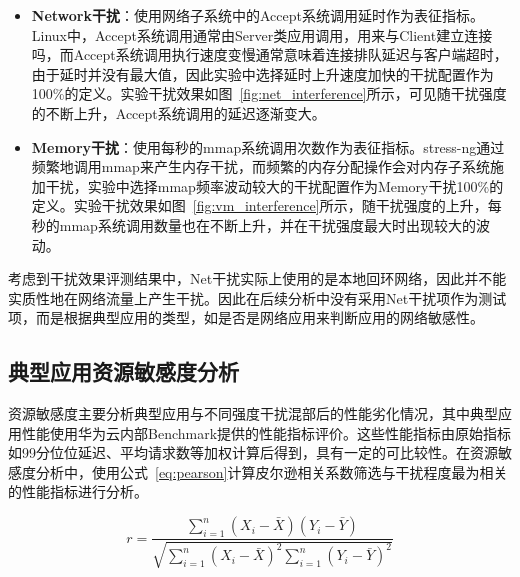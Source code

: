 \begin{itemize}
    \item \textbf{Network干扰}：使用网络子系统中的Accept系统调用延时作为表征指标。Linux中，Accept系统调用通常由Server类应用调用，用来与Client建立连接吗，而Accept系统调用执行速度变慢通常意味着连接排队延迟与客户端超时，由于延时并没有最大值，因此实验中选择延时上升速度加快的干扰配置作为100\%的定义。实验干扰效果如图~\ref{fig:net_interference}所示，可见随干扰强度的不断上升，Accept系统调用的延迟逐渐变大。
    
    \item \textbf{Memory干扰}：使用每秒的mmap系统调用次数作为表征指标。stress-ng通过频繁地调用mmap来产生内存干扰，而频繁的内存分配操作会对内存子系统施加干扰，实验中选择mmap频率波动较大的干扰配置作为Memory干扰100\%的定义。实验干扰效果如图~\ref{fig:vm_interference}所示，随干扰强度的上升，每秒的mmap系统调用数量也在不断上升，并在干扰强度最大时出现较大的波动。

\end{itemize}

考虑到干扰效果评测结果中，Net干扰实际上使用的是本地回环网络，因此并不能实质性地在网络流量上产生干扰。因此在后续分析中没有采用Net干扰项作为测试项，而是根据典型应用的类型，如是否是网络应用来判断应用的网络敏感性。

\subsection{典型应用资源敏感度分析}

资源敏感度主要分析典型应用与不同强度干扰混部后的性能劣化情况，其中典型应用性能使用华为云内部Benchmark提供的性能指标评价。这些性能指标由原始指标如99分位位延迟、平均请求数等加权计算后得到，具有一定的可比较性。在资源敏感度分析中，使用公式~\eqref{eq:pearson}计算皮尔逊相关系数筛选与干扰程度最为相关的性能指标进行分析。

\begin{equation}
    r = \frac{\sum_{i=1}^n (X_i - \bar{X})(Y_i - \bar{Y})}{\sqrt{\sum_{i=1}^n (X_i - \bar{X})^2 \sum_{i=1}^n (Y_i - \bar{Y})^2}}
\label{eq:pearson}
\end{equation}

